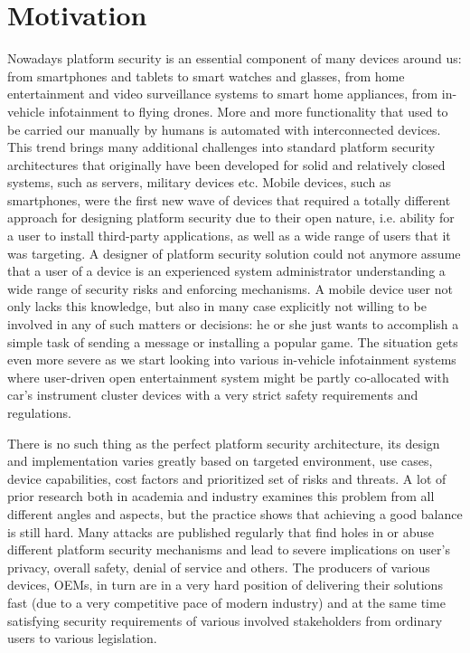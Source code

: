 \begin{quoting}
\end{quoting}

\section{Motivation}

Nowadays platform security is an essential component of many devices around us: from smartphones and tablets to smart watches and glasses, from home entertainment and video surveillance systems to smart home appliances, from in-vehicle infotainment to flying drones. More and more functionality that used to be carried our manually by humans is automated with interconnected devices. This trend brings many additional challenges into standard platform security architectures that originally have been developed for solid and relatively closed systems, such as servers, military devices etc. Mobile devices, such as smartphones, were the first new wave of devices that required a totally different approach for designing platform security due to their open nature, i.e. ability for a user to install third-party applications, as well as a wide range of users that it was targeting. A designer of platform security solution could not anymore assume that a user of a device is an experienced system administrator understanding a wide range of security risks and enforcing mechanisms. A mobile device user not only lacks this knowledge, but also in many case explicitly not willing to be involved in any of such matters or decisions: he or she just wants to accomplish a simple task of sending a message or installing a popular game. The situation gets even more severe as we start looking into various in-vehicle infotainment systems where user-driven open entertainment system might be partly co-allocated with car's instrument cluster devices with a very strict safety requirements and regulations. 

There is no such thing as the perfect platform security architecture, its design and implementation varies greatly based on targeted environment, use cases, device capabilities, cost factors and prioritized set of risks and threats. A lot of prior research both in academia and industry examines this problem from all different angles and aspects, but the practice shows that achieving a good balance is still hard. Many attacks are published regularly that find holes in or abuse different platform security mechanisms and lead to severe implications on user's privacy, overall safety, denial of service and others. The producers of various devices, OEMs, in turn are in a very hard position of delivering their solutions fast (due to a very competitive pace of modern industry) and at the same time satisfying security requirements of various involved stakeholders from ordinary users to various legislation. 

